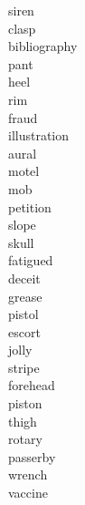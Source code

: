 \documentclass[a4paper, 11pt]{ctexart}
\begin{document}
\begin{multicols*}{3}
\begin{description}
\item[siren]

\item[clasp]

\item[bibliography]

\item[pant]

\item[heel]

\item[rim]

\item[fraud]

\item[illustration]

\item[aural]

\item[motel]

\item[mob]

\item[petition]

\item[slope]

\item[skull]

\item[fatigued]

\item[deceit]

\item[grease]

\item[pistol]

\item[escort]

\item[jolly]

\item[stripe]

\item[forehead]

\item[piston]

\item[thigh]

\item[rotary]

\item[passerby]

\item[wrench]

\item[vaccine]


\end{description}
\end{multicols*}
\end{document}
